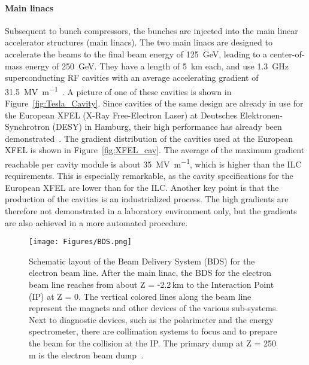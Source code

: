 \paragraph{Main linacs}
Subsequent to bunch compressors, the bunches are injected into the main linear accelerator structures (main linacs).
The two main linacs are designed to accelerate the beams to the final beam energy of \SI{125}{\GeV}, leading to a center-of-mass energy of \SI{250}{\GeV}.
They have a length of \SI{5}{\kilo\meter} each, and use \SI{1.3}{\giga\hertz} superconducting RF cavities with an average accelerating gradient of \SI{31.5}{\mega\volt\per\meter}~\cite{Walker}.
A picture of one of these cavities is shown in Figure~\ref{fig:Tesla_Cavity}. 
Since cavities of the same design are already in use for the European XFEL (X-Ray Free-Electron Laser) at Deutsches Elektronen-Synchrotron (DESY) in Hamburg, their high performance has already been demonstrated~\cite{XFEL}.
The gradient distribution of the cavities used at the European XFEL is shown in Figure~\ref{fig:XFEL_cav}.
The average of the maximum gradient reachable per cavity module is about \SI{35}{\mega\volt\per\meter}, which is higher than the ILC requirements.
This is especially remarkable, as the cavity specifications for the European XFEL are lower than for the ILC.
Another key point is that the production of the cavities is an industrialized process.
The high gradients are therefore not demonstrated in a laboratory environment only, but the gradients are also achieved in a more automated procedure.

\begin{figure}[h!]
\centering
\texttt{[image: Figures/BDS.png]}
\caption[Layout of the Beam Delivery System]{Schematic layout of the Beam Delivery System (BDS) for the electron beam line.
After the main linac, the BDS for the electron beam line reaches from about Z = -2.2\,km to the Interaction Point (IP) at Z = 0.
The vertical colored lines along the beam line represent the magnets and other devices of the various sub-systems.
Next to diagnostic devices, such as the polarimeter and the energy spectrometer, there are collimation systems to focus and to prepare the beam for the collision at the IP.
The primary dump at Z = 250\,m is the electron beam dump~\cite[p. 135]{TDR32}.}
\label{fig:BDS}
\end{figure}

